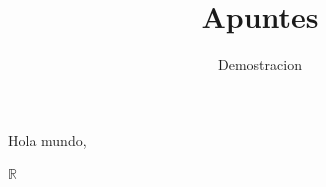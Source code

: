 \documentclass{article}
\title{Apuntes}
\author{Demostracion}
\theoremstyle{mytheoremstyle}
\theoremstyle{mytheoremstyle}
\theoremstyle{myproblemstyle}
\begin{document}
    \maketitle
    Hola mundo,

    \lipsum[2]

    $\mathbb{R}$
\end{document}
